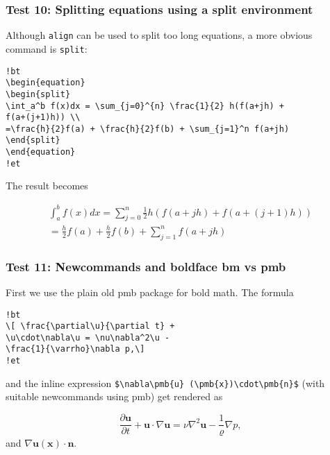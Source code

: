 \documentclass[]{article}
\begin{document}
\subsubsection{Test 10: Splitting equations using a split
environment}\label{test-10-splitting-equations-using-a-split-environment}

Although \texttt{align} can be used to split too long equations, a more
obvious command is \texttt{split}:

\begin{verbatim}
!bt
\begin{equation}
\begin{split}
\int_a^b f(x)dx = \sum_{j=0}^{n} \frac{1}{2} h(f(a+jh) +
f(a+(j+1)h)) \\ 
=\frac{h}{2}f(a) + \frac{h}{2}f(b) + \sum_{j=1}^n f(a+jh)
\end{split}
\end{equation}
!et
\end{verbatim}

The result becomes

\[
\begin{equation}
\begin{split}
\int_a^b f(x)dx = \sum_{j=0}^{n} \frac{1}{2} h(f(a+jh) +
f(a+(j+1)h)) \\ 
=\frac{h}{2}f(a) + \frac{h}{2}f(b) + \sum_{j=1}^n f(a+jh)
\end{split}
\end{equation}
\]

\subsubsection{Test 11: Newcommands and boldface bm vs
pmb}\label{test-11-newcommands-and-boldface-bm-vs-pmb}

First we use the plain old pmb package for bold math. The formula

\begin{verbatim}
!bt
\[ \frac{\partial\u}{\partial t} +
\u\cdot\nabla\u = \nu\nabla^2\u -
\frac{1}{\varrho}\nabla p,\]
!et
\end{verbatim}

and the inline expression
\texttt{\$\textbackslash{}nabla\textbackslash{}pmb\{u\}\ (\textbackslash{}pmb\{x\})\textbackslash{}cdot\textbackslash{}pmb\{n\}\$}
(with suitable newcommands using pmb) get rendered as

\[
 \frac{\partial\pmb{u}}{\partial t} +
\pmb{u}\cdot\nabla\pmb{u} = \nu\nabla^2\pmb{u} -
\frac{1}{\varrho}\nabla p,
\] and \(\nabla\pmb{u} (\pmb{x})\cdot\pmb{n}\).
\end{document}
